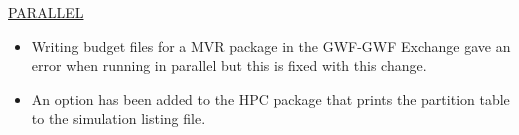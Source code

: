 




	\underline{PARALLEL}
	\begin{itemize}
		\item Writing budget files for a MVR package in the GWF-GWF Exchange gave an error when running in parallel but this is fixed with this change.
		\item An option has been added to the HPC package that prints the partition table to the simulation listing file.
	\end{itemize}

